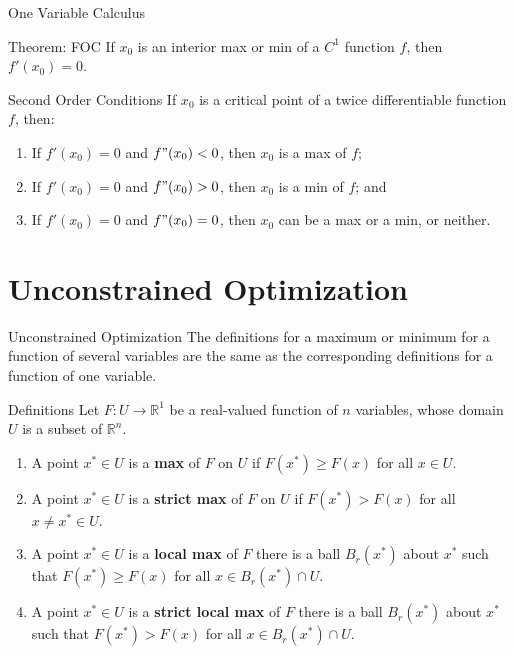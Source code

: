 \documentclass{beamer}
\begin{document}
\begin{frame}{One Variable Calculus}
\begin{block}{Theorem: FOC }
If $x_0$ is an interior max or min of a $C^1$ function $f$, then $f'(x_0)=0$.

\end{block}
\begin{block}{Second Order Conditions}
If $x_0$ is a critical point of a twice differentiable function $f$, then:
\begin{enumerate}
    \item If $f'(x_0)=0$ and $f"(x_0)<0$, then $x_0$ is a max of $f$;
     \item If $f'(x_0)=0$ and $f"(x_0)>0$, then $x_0$ is a min of $f$; and
      \item If $f'(x_0)=0$ and $f"(x_0)=0$, then $x_0$ can be a max or a min, or neither.
\end{enumerate}
\end{block}
\end{frame}
\section{Unconstrained Optimization}
\begin{frame}{Unconstrained Optimization}
    The definitions for a maximum or minimum for a function of several variables are the same as the corresponding definitions for a function of one variable. 
    \begin{block}{Definitions}
    Let $F:U\to \mathbb{R}^1$ be a real-valued function of $n$ variables, whose domain $U$ is a subset of $\mathbb{R}^n$. 
    \begin{enumerate}
        \item A point $x^*\in U$ is a \textbf{max } of $F$ on $U$ if $F(x^*)\geq F(x)$ for all $x\in U$. 
       \item A point $x^*\in U$ is a \textbf{strict max } of $F$ on $U$ if $F(x^*)> F(x)$ for all $x\neq x^*\in U$. 
       \item A point $x^*\in U$ is a \textbf{local max } of $F$ there is a ball $B_r(x^*)$ about $x^*$ such that $F(x^*)\geq F(x)$ for all $x\in B_r(x^*)\cap U$.
  \item A point $x^*\in U$ is a \textbf{strict local max } of $F$ there is a ball $B_r(x^*)$ about $x^*$ such that $F(x^*)> F(x)$ for all $x\in B_r(x^*)\cap U$.
    \end{enumerate}
    \end{block}
\end{frame}
\end{document}

